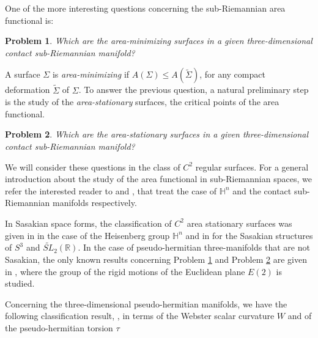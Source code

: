 \documentclass[10pt]{amsart}
\theoremstyle{definition}
\newtheorem{problem}{Problem}
\theoremstyle{remark}
\numberwithin{equation}{section}
\begin{document}
One of the more interesting questions concerning the sub-Riemannian area functional is:

\begin{problem}\label{domanda1}
\emph{Which are the area-minimizing surfaces in a given three-dimensional contact sub-Riemannian manifold?}
\end{problem}

A surface ${\Sigma}$ is \emph{area-minimizing} if ${A}({\Sigma}){\leqslant} {A}(\tilde{\Sigma})$, for any compact deformation $\tilde{\Sigma}$ of ${\Sigma}$. To answer the previous question, a natural preliminary step is the study of the \emph{area-stationary} surfaces, the critical points of the area functional.

\begin{problem}\label{domanda2}
\emph{Which are the area-stationary surfaces in a given three-dimensional contact sub-Riemannian manifold?}
\end{problem}

We will consider these questions in the class of $C^2$ regular surfaces. For a general introduction about the study of the area functional in sub-Riemannian spaces, we refer the interested reader to \cite{CDPT} and \cite{Gaphd}, that treat the case of ${{\mathbb{H}}}^n$ and  the contact sub-Riemannian manifolds respectively.

In Sasakian space forms, the classification of $C^2$ area stationary surfaces was given in \cite{Ri-Ro-Hu} in the case of the Heisenberg group ${{\mathbb{H}}}^n$ and in  \cite{Ro} for the Sasakian structures of  $S^3$ and $\widetilde{SL}_2({{\mathbb{R}}})$.   In the case of pseudo-hermitian three-manifolds that are not Sasakian, the only known results concerning Problem \ref{domanda1}  and Problem \ref{domanda2} are given in \cite{MR3044134}, where the group of the rigid motions of the Euclidean plane $E(2)$ is studied. 

Concerning the three-dimensional pseudo-hermitian manifolds, we have the following classification result, \cite[Theorem~3.1]{Pe}, in terms of the Webster scalar curvature $W$ and of the pseudo-hermitian torsion $\tau$
\end{document}
